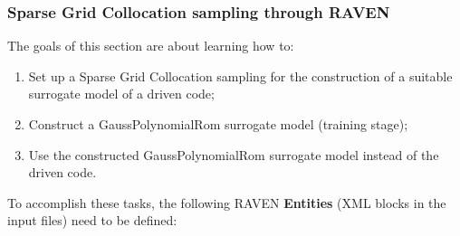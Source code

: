 \subsubsection{Sparse Grid Collocation sampling through RAVEN}
\label{subsub:SGcsamplingExample}
The goals of this section are about learning how to:
 \begin{enumerate}
   \item Set up a Sparse Grid Collocation sampling for the construction of a suitable surrogate model of a driven code;
   \item Construct a GaussPolynomialRom surrogate model (training stage);
   \item Use the constructed GaussPolynomialRom surrogate model instead of the driven code.
\end{enumerate}  
To accomplish these tasks, the following RAVEN \textbf{Entities} (XML blocks in the input files) need to be defined:
